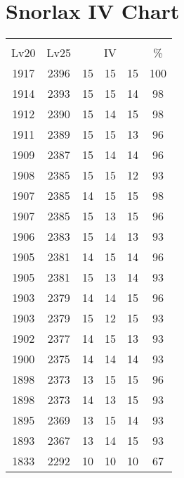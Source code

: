 \documentclass{article}%
\begin{document}
%
\normalsize%
\section{Snorlax IV Chart}%
\label{sec:Snorlax IV Chart}%
\renewcommand{\arraystretch}{1.5}%
\begin{tabular}{|c|c|c|c|c|c|}%
\hline%
\multicolumn{6}{|c|}{\textcolor{white}{ 
\linebreak{Snorlax}
}%
\cellcolor{black}}\\%
\multicolumn{1}{|c}{Lv20}&\multicolumn{1}{c|}{Lv25}&\multicolumn{3}{c|}{IV}&\multicolumn{1}{|c|}{\%}\\%
\hline%
\rowcolor{color100}%
1917&2396&15&15&15&100\\%
\hline%
\rowcolor{color98}%
1914&2393&15&15&14&98\\%
\hline%
\rowcolor{color98}%
1912&2390&15&14&15&98\\%
\hline%
\rowcolor{color96}%
1911&2389&15&15&13&96\\%
\hline%
\rowcolor{color96}%
1909&2387&15&14&14&96\\%
\hline%
\rowcolor{color93}%
1908&2385&15&15&12&93\\%
\hline%
\rowcolor{color98}%
1907&2385&14&15&15&98\\%
\hline%
\rowcolor{color96}%
1907&2385&15&13&15&96\\%
\hline%
\rowcolor{color93}%
1906&2383&15&14&13&93\\%
\hline%
\rowcolor{color96}%
1905&2381&14&15&14&96\\%
\hline%
\rowcolor{color93}%
1905&2381&15&13&14&93\\%
\hline%
\rowcolor{color96}%
1903&2379&14&14&15&96\\%
\hline%
\rowcolor{color93}%
1903&2379&15&12&15&93\\%
\hline%
\rowcolor{color93}%
1902&2377&14&15&13&93\\%
\hline%
\rowcolor{color93}%
1900&2375&14&14&14&93\\%
\hline%
\rowcolor{color96}%
1898&2373&13&15&15&96\\%
\hline%
\rowcolor{color93}%
1898&2373&14&13&15&93\\%
\hline%
\rowcolor{color93}%
1895&2369&13&15&14&93\\%
\hline%
\rowcolor{color93}%
1893&2367&13&14&15&93\\%
\hline%
\rowcolor{color91}%
1833&2292&10&10&10&67\\%
\end{tabular}

%
\end{document}

